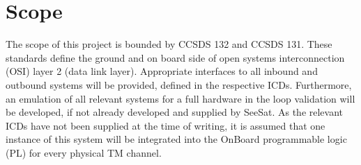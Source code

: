 \chapter{Scope}
The scope of this project is bounded by CCSDS 132 and CCSDS 131. These standards define the ground and on board side of open systems interconnection (OSI) layer 2 (data link layer). Appropriate interfaces to all inbound and outbound systems will be provided, defined in the respective ICDs. Furthermore, an emulation of all relevant systems for a full hardware in the loop validation will be developed, if not already developed and supplied by SeeSat. As the relevant ICDs have not been supplied at the time of writing, it is assumed that one instance of this system will be integrated into the OnBoard programmable logic (PL) for every physical TM channel.